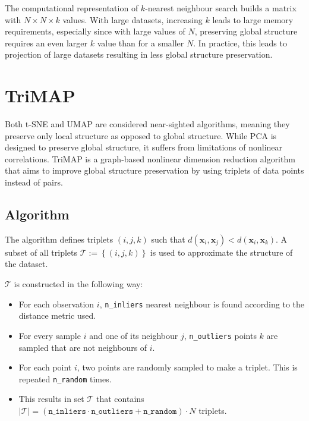 The computational representation of $k$-nearest neighbour search builds a matrix with $N \times N \times k$ values. With large datasets, increasing $k$ leads to large memory requirements, especially since with large values of $N$, preserving global structure requires an even larger $k$ value than for a smaller $N$. In practice, this leads to projection of large datasets resulting in less global structure preservation.

\section{TriMAP}\label{sec:trimap}

Both t-SNE and UMAP are considered near-sighted algorithms, meaning they preserve only local structure as opposed to global structure. While PCA is designed to preserve global structure, it suffers from limitations of nonlinear correlations. TriMAP \cite{bib:trimap} is a graph-based nonlinear dimension reduction algorithm that aims to improve global structure preservation by using triplets of data points instead of pairs.



\subsection{Algorithm}

The algorithm defines triplets $(i, j, k)$ such that $d(\mathbf{x}_i, \mathbf{x}_j) < d(\mathbf{x}_i, \mathbf{x}_k)$. A subset of all triplets $\mathcal{T} := \left\lbrace (i,j,k) \right\rbrace$ is used to approximate the structure of the dataset.

$\mathcal{T}$ is constructed in the following way:

\begin{itemize}
	\item For each observation $i$, \texttt{n\_inliers} nearest neighbour is found according to the distance metric used.
	\item For every sample $i$ and one of its neighbour $j$, \texttt{n\_outliers} points $k$ are sampled that are not neighbours of $i$.
	\item For each point $i$, two points are randomly sampled to make a triplet. This is repeated \texttt{n\_random} times.
	\item This results in set $\mathcal{T}$ that contains $\vert \mathcal{T} \vert = (\texttt{n\_inliers} \cdot \texttt{n\_outliers} + \texttt{n\_random}) \cdot N$ triplets.
\end{itemize}

